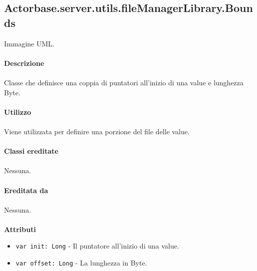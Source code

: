 \documentclass[a4paper]{article}
\begin{document}
	\subsection{Actorbase.server.utils.fileManagerLibrary.Bounds}
		Immagine UML.
		\\ \\
		\textbf{Descrizione}
		\\ \\
		Classe che definisce una coppia di puntatori all'inizio di una value e lunghezza Byte.
		\\ \\
		\textbf{Utilizzo}
		\\ \\
		Viene utilizzata per definire una porzione del file delle value.
		\\ \\
		\textbf{Classi ereditate}
		\\ \\
		Nessuna.
		\\ \\
		\textbf{Ereditata da}
		\\ \\
		Nessuna.
		\\ \\
		\textbf{Attributi}
		\begin{itemize}
			\item \texttt{var init: Long} - Il puntatore all'inizio di una value.
			\item \texttt{var offset: Long} - La lunghezza in Byte.
		\end{itemize}	

	
	
\end{document}
